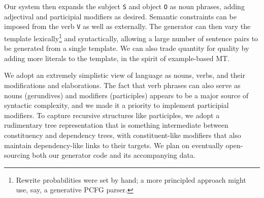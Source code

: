 \noindent Our system then expands the subject {\small \tt S} and object {\small \tt O} as noun phrases, adding adjectival and participial modifiers as desired. 
Semantic constraints can be imposed from the verb {\small \tt V} as well as externally.
The generator can then vary the template lexically\footnote{
    Rewrite probabilities were set by hand; a more principled approach might use, say, a generative PCFG parser.} and syntactically, allowing a large number of sentence pairs to be generated from a single template.
We can also trade quantity for quality by adding more literals to the template, in the spirit of example-based MT.


We adopt an extremely simplistic view of language as nouns, verbs, and their modifications and elaborations.
The fact that verb phrases can also serve as nouns (gerundives) and modifiers (participles) appears to be a major source of syntactic complexity, and we made it a priority to implement participial modifiers.
To capture recursive structures like participles, we adopt a rudimentary tree representation that is something intermediate between constituency and dependency trees, with constituent-like modifiers that also maintain dependency-like links to their targets.
We plan on eventually open-sourcing both our generator code and its accompanying data.

